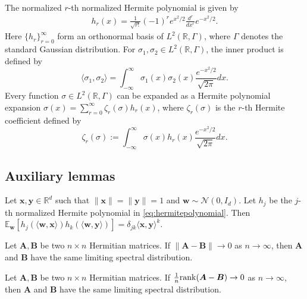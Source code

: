\documentclass[twoside,11pt]{article}
\newcommand{\R}{\mathbb{R}}
\newcommand{\E}{\mathbb{E}}
\def\bA{{\boldsymbol A}}
\def\bB{{\boldsymbol B}}
\def\rank{{\rm rank}}
\newcommand{\x}{\boldsymbol{x}}
\newcommand{\y}{\boldsymbol{y}}
\newcommand{\w}{\mbi{w}}
\newcommand{\1}{\mathbf{1}}
\def\mbi#1{\boldsymbol{#1}}
\def\mbi#1{\boldsymbol{#1}} %
\begin{document}
\begin{definition}\label{def:hermitepolynomial}
The normalized $r$-th normalized Hermite polynomial is given by 
\begin{align} \label{eq:hermitepolynomial}
h_r(x)=\frac{1}{\sqrt {r!}} (-1)^r e^{x^2/2} \frac{d^r}{dx^r} e^{-x^2/2}.
\end{align}
Here $\{h_r\}_{r=0}^{\infty}$ form an orthonormal basis of $L^2(\mathbb R, \Gamma)$, where $\Gamma$ denotes the standard Gaussian distribution. For $\sigma_1,\sigma_2\in L^2(\mathbb R, \Gamma)$,  the inner product is defined by 
$$\langle \sigma_1,\sigma_2\rangle =\int_{-\infty}^{\infty} \sigma_1(x)\sigma_2(x) \frac{e^{-x^2/2}}{\sqrt{2\pi}}dx.$$  Every function $\sigma \in L^2(\mathbb R, \Gamma)$ can be expanded as a Hermite polynomial expansion    $\sigma(x)=\sum_{r=0}^{\infty}\zeta_r(\sigma)h_r(x)$,
where $\zeta_r(\sigma)$ is the $r$-th Hermite coefficient defined by 
$$\zeta_r(\sigma):=\int_{-\infty}^{\infty} \sigma(x)h_r(x)\frac{e^{-x^2/2}}{\sqrt{2\pi}}dx.
$$
\end{definition}

\subsection{Auxiliary lemmas}

\begin{lemma} \label{lem:NM20D2} Let $\x, \y\in \R^d$ such that $\|\x\|=\| \y\|=1$ and $\w\sim \mathcal N(0, I_{d})$. Let $h_j$ be the $j$-th normalized Hermite polynomial in \eqref{eq:hermitepolynomial}. Then 
$
    \E_{\w}[h_j(\langle \w,\x\rangle)h_k(\langle \w,\y\rangle)  ]= \delta_{jk} \langle \x, \y \rangle ^k$.
\end{lemma}



\begin{lemma}\label{lem:BS10A45}
Let $\bA, \bB$ be two $n\times n$ Hermitian matrices. If $\|\bA-\bB\|\to 0$ as $n\to\infty$, then $\bA$ and $\bB$ have the same limiting spectral distribution.
\end{lemma}





\begin{lemma}\label{lem:lowrank}
   Let $\bA, \bB$ be two $n\times n$ Hermitian matrices. If $\frac{1}{n}\rank(\bA-\bB)\to 0$ as $n\to\infty$, then $\bA$ and $\bB$ have the same limiting spectral distribution.
\end{lemma}
\end{document}
